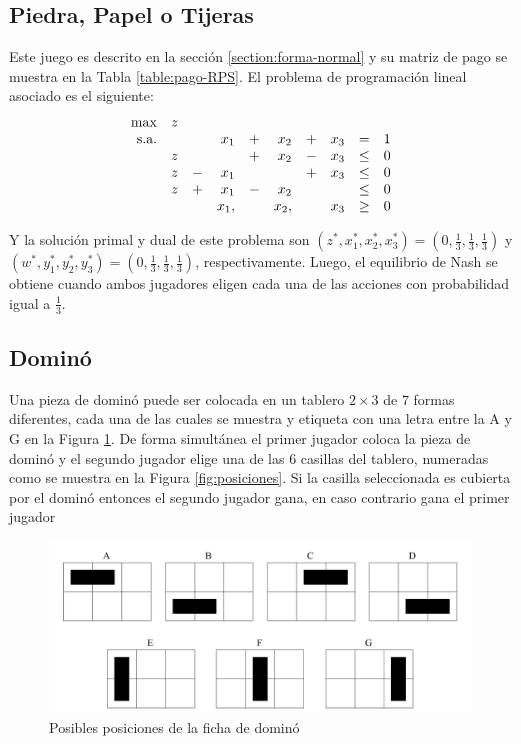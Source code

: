 \subsection{Piedra, Papel o Tijeras}
Este juego es descrito en la sección \ref{section:forma-normal} y su matriz de pago se muestra en la Tabla \ref{table:pago-RPS}. El problema de programación lineal asociado es el siguiente:
\begin{equation}
\begin{array}{r r r r r r r r r r}
\max  & z &  & & & & &\\
\text{s.a.}  
&   &   & x_1  & + & x_2  & + & x_3 & =    & 1 \\
& z &   &      & + & x_2  & - & x_3 & \leq & 0 \\
& z & - & x_1  &   &      & + & x_3 & \leq & 0 \\
& z & + & x_1  & - & x_2  &   &     & \leq & 0 \\
&   &   & x_1, &   & x_2, &   & x_3 & \geq & 0
\end{array}
\end{equation}

Y la solución primal y dual de este problema son $(z^*, x_1^*, x_2^*, x_3^*) = (0, \frac{1}{3}, \frac{1}{3}, \frac{1}{3})$ y $(w^*, y_1^*, y_2^*, y_3^*) = (0, \frac{1}{3}, \frac{1}{3}, \frac{1}{3})$, respectivamente. Luego, el equilibrio de Nash se obtiene cuando ambos jugadores eligen cada una de las acciones con probabilidad igual a $\frac{1}{3}$.

\subsection{Dominó}
Una pieza de dominó puede ser colocada en un tablero $2\times 3$ de $7$ formas diferentes, cada una de las cuales se muestra y etiqueta con una letra entre la A y G en la Figura \ref{fig:posiciones-domino}. De forma simultánea el primer jugador coloca la pieza de dominó y el segundo jugador elige una de las $6$ casillas del tablero, numeradas como se muestra en la Figura \ref{fig:posiciones}. Si la casilla seleccionada es cubierta por el dominó entonces el segundo jugador gana, en caso contrario gana el primer jugador \cite[p. 237]{bib:pl-chvatal}
\begin{figure}[ht]
\caption{Posibles posiciones de la ficha de dominó}
\label{fig:posiciones-domino}
\centering
\includegraphics[width=1\textwidth]{figuras/posiciones-domino.png}
\end{figure}

